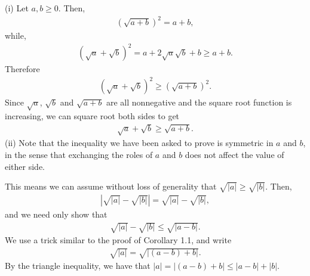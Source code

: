 \documentclass[letterpaper,10pt,english]{jupyterBook}
\begin{document}
\sphinxAtStartPar
{\hyperref[\detokenize{Problems:p4}]{}}(i) Let \(a, b \geq 0\). Then,
\begin{equation*}
\begin{split}
\left(\sqrt{a+b}\right)^2 = a+b,
\end{split}
\end{equation*}
\sphinxAtStartPar
while,
\begin{equation*}
\begin{split}
\left(\sqrt{a}+\sqrt{b}\right)^2 = a + 2\sqrt{a}\sqrt{b} + b \geq a+b.
\end{split}
\end{equation*}
\sphinxAtStartPar
Therefore
\begin{equation*}
\begin{split}
\left(\sqrt{a}+\sqrt{b}\right)^2 \geq \left(\sqrt{a+b}\right)^2.
\end{split}
\end{equation*}
\sphinxAtStartPar
Since \(\sqrt{a}\), \(\sqrt{b}\) and \(\sqrt{a+b}\) are all non\sphinxhyphen{}negative and the square root function is increasing, we can square root both sides to get
\begin{equation*}
\begin{split}
\sqrt{a}+\sqrt{b}\geq\sqrt{a+b}.
\end{split}
\end{equation*}
\sphinxAtStartPar
(ii)  Note that the inequality we have been asked to prove is symmetric in \(a\) and \(b\), in the sense that exchanging the roles of \(a\) and \(b\) does not affect the value of either side.

\sphinxAtStartPar
This means we can assume without loss of generality that \(\sqrt{|a|}\geq\sqrt{|b|}\). Then,
\begin{equation*}
\begin{split}
\left|\sqrt{|a|} - \sqrt{|b|}\right| = \sqrt{|a|}-\sqrt{|b|},
\end{split}
\end{equation*}
\sphinxAtStartPar
and we need only show that
\begin{equation}\label{equation:Solutions-upto6:eq:sqrta-sqrtb}
\begin{split}\sqrt{|a|} - \sqrt{|b|} \leq \sqrt{|a - b|}.\end{split}
\end{equation}
\sphinxAtStartPar
We use a trick similar to the proof of Corollary 1.1, and write
\begin{equation*}
\begin{split}
\sqrt{|a|} = \sqrt{\big|(a-b) + b\big|}.
\end{split}
\end{equation*}
\sphinxAtStartPar
By the triangle inequality, we have that \(|a| = \big|(a-b) + b\big| \leq |a-b|+|b|\).
\end{document}
